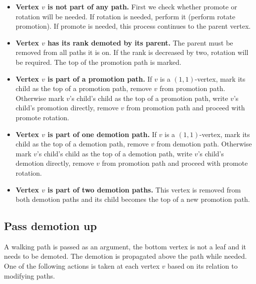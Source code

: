\begin{itemize}

\item {\bfseries Vertex $v$ is not part of any path.} First we check whether promote or rotation will be needed. If rotation is needed, perform it (perform rotate promotion). If promote is needed, this process continues to the parent vertex.

\item {\bfseries Vertex $v$ has its rank demoted by its parent.} The parent must be removed from all paths it is on. If the rank is decreased by two, rotation will be required. The top of the promotion path is marked.

\item {\bfseries Vertex $v$ is part of a promotion path.} \newline If $v$ is a $(1,1)$-vertex, mark its child as the top of a promotion path, remove $v$ from promotion path. Otherwise mark $v$'s child's child as the top of a promotion path, write $v$'s child's promotion directly, remove $v$ from promotion path and proceed with promote rotation. 

\item {\bfseries Vertex $v$ is part of one demotion path.} If $v$ is a $(1,1)$-vertex, mark its child as the top of a demotion path, remove $v$ from demotion path. Otherwise mark $v$'s child's child as the top of a demotion path, write $v$'s child's demotion directly, remove $v$ from promotion path and proceed with promote rotation.

\item {\bfseries Vertex $v$ is part of two demotion paths.} This vertex is removed from both demotion paths and its child becomes the top of a new promotion path.

\end{itemize}

\subsection{Pass demotion up}

A walking path is passed as an argument, the bottom vertex is not a leaf and it needs to be demoted. The demotion is propagated above the path while needed. One of the following actions is taken at each vertex $v$ based on its relation to modifying paths.

